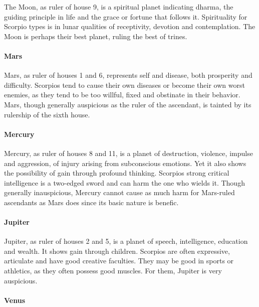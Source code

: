 The Moon, as ruler of house 9, is a spiritual planet indicating dharma, the guiding principle in life and the grace or fortune that follows it. Spirituality for Scorpio types is in lunar qualities of receptivity, devotion and contemplation. The Moon is perhaps their best planet, ruling the best of trines.

 

\paragraph{Mars}

Mars, as ruler of houses 1 and 6, represents self and disease, both prosperity and difficulty. Scorpios tend to cause their own diseases or become their own worst enemies, as they tend to be too willful, fixed and obstinate in their behavior. Mars, though generally auspicious as the ruler of the ascendant, is tainted by its rulership of the sixth house.

 

\paragraph{Mercury}

Mercury, as ruler of houses 8 and 11, is a planet of destruction, violence, impulse and aggression, of injury arising from subconscious emotions. Yet it also shows the possibility of gain through profound thinking. Scorpios strong critical intelligence is a two-edged sword and can harm the one who wields it. Though generally inauspicious, Mercury cannot cause as much harm for Mars-ruled ascendants as Mars does since its basic nature is benefic.

 

\paragraph{Jupiter}

Jupiter, as ruler of houses 2 and 5, is a planet of speech, intelligence, education and wealth. It shows gain through children. Scorpios are often expressive, articulate and have good creative faculties. They may be good in sports or athletics, as they often possess good muscles. For them, Jupiter is very auspicious.

 

\paragraph{Venus}

